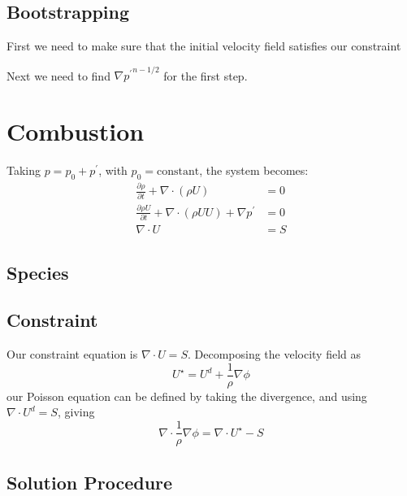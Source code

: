 \subsection{Bootstrapping}

First we need to make sure that the initial velocity field satisfies our constraint

Next we need to find $\nabla {p^\prime}^{n-1/2}$ for the first step.



\section{Combustion}


Taking $p = p_0 + p^\prime$, with $p_0 = \mathrm{constant}$, the system 
becomes:
\begin{align}
\frac{\partial \rho}{\partial t} + \nabla \cdot (\rho U) &= 0 \\
\frac{\partial \rho U}{\partial t} + \nabla \cdot (\rho U U) + \nabla p^\prime &= 0 \\
\nabla \cdot U &= S
\end{align}

\subsection{Species}


\subsection{Constraint}

Our constraint equation is $\nabla \cdot U = S$.  Decomposing the
velocity field as
\begin{equation}
U^\star = U^d + \frac{1}{\rho} \nabla \phi
\end{equation}
our Poisson equation can be defined by taking the divergence, and
using $\nabla \cdot U^d = S$, giving
\begin{equation}
\nabla \cdot \frac{1}{\rho} \nabla \phi = \nabla \cdot U^\star - S
\end{equation}


\subsection{Solution Procedure}

